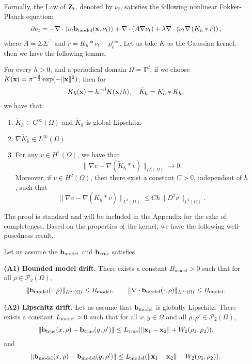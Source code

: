 Formally, the Law of $\mathbf{Z}_t$, denoted by $\nu_t$, satisfies the following nonlinear Fokker-Planck equation:
\begin{equation}\label{equ:fpk_regularized}
\partial \nu _t = -\nabla\cdot \left(\nu_t\mathbf{b}_{\mathrm{model}}(\mathbf{x},\nu_t)\right) + \nabla \cdot \left(A \nabla \nu_t \right)+\lambda \nabla \cdot \left( \nu_t \nabla \left( K_h * r \right) \right),
\end{equation}
where $A = \Sigma\Sigma^\top$ and $r = K_h * \nu_t - \mu^{\mathrm{obs}}_t$.
Let us take $K$ as the Gaussian kernel, then we have the following lemma.
\begin{lemma}\label{lemma:kernel}
    For every $h>0$, and a periodical domain $\Omega=\mathbb T^d$, if we choose \(K(\mathbf{x}) =\pi^{-\frac{d}{2}} \exp(-\|\mathbf{x}\|^2)\), then for  \[
    K_h(\mathbf{x}) = h^{-d}K(\mathbf{x}/h), \quad \tilde K_h = K_h * K_h,
    \]  we have that 
    \begin{enumerate}
        \item $\tilde K_h \in C^{\infty}(\Omega)$ and $\tilde K_h$ is global Lipschitz.
        \item $\nabla \tilde K_h\in L^\infty(\Omega)$ 
        \item For any $v\in H^1(\Omega)$, we have that 
        \[
        \|\nabla v - \nabla (\tilde K_h *v)\|_{L^2(\Omega)} \to 0.
        \] Moreover, if $v\in H^2(\Omega)$, then there exist a constant $C>0$, independent of $h$, such that 
        \[
        \|\nabla v-\nabla(\tilde K_h*v)\|_{L^2(\Omega)}
\le Ch\|D^2 v\|_{L^2(\Omega)}.
        \]
    \end{enumerate}
\end{lemma}
The proof is standard and will be included in the Appendix for the sake of completeness.
Based on the properties of the kernel, we have the following well-posedness result.
\begin{assumption}\label{ass:regularity}
Let us assume the $\mathbf{b}_{\mathrm{model}}$ and $\mathbf{b}_{\mathrm{true}}$ satisfies

\medskip
\noindent\textbf{(A1) Bounded model drift.}
There exists a constant $B_{\mathrm{model}}>0$ such that for all $\rho\in\mathcal P_2(\Omega)$,
\[
\|\mathbf{b}_{\mathrm{model}}(\cdot,\rho)\|_{L^\infty(\Omega)} \le B_{\mathrm{model}},
\qquad
\|\nabla\cdot \mathbf{b}_{\mathrm{model}}(\cdot,\rho)\|_{L^\infty(\Omega)} \le B_{\mathrm{model}} .
\]

\medskip
\noindent\textbf{(A2) Lipschitz drift.}
Let us assume that $\mathbf{b}_{\mathrm{model}}$ is globally Lipschitz:
There exists a constant $L_{\mathrm{model}}>0$ such that for all $x,y\in\Omega$ and all $\rho,\rho'\in\mathcal P_2(\Omega)$,
\[
\|\mathbf{b}_{\mathrm{true}}(x,\rho)-\mathbf{b}_{\mathrm{true}}(y,\rho')\| \le L_{\mathrm{true}}(\|\mathbf{x}_1-\mathbf{x}_2\|+W_2(\rho_1,\rho_2)) .
\]
and
\[
\|\mathbf{b}_{\mathrm{model}}(x,\rho)-\mathbf{b}_{\mathrm{model}}(y,\rho')\| \le L_{\mathrm{model}}(\|\mathbf{x}_1-\mathbf{x}_2\|+W_2(\rho_1,\rho_2)) .
\]

\end{assumption}

